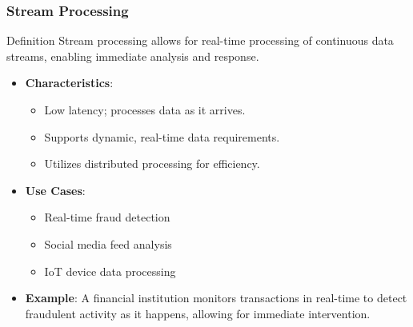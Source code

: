 \documentclass[aspectratio=169]{beamer}
\begin{document}
\begin{frame}[fragile]
    \frametitle{Stream Processing}
    \begin{block}{Definition}
        Stream processing allows for real-time processing of continuous data streams, enabling immediate analysis and response.
    \end{block}
    \begin{itemize}
        \item \textbf{Characteristics}:
        \begin{itemize}
            \item Low latency; processes data as it arrives.
            \item Supports dynamic, real-time data requirements.
            \item Utilizes distributed processing for efficiency.
        \end{itemize}
        
        \item \textbf{Use Cases}:
        \begin{itemize}
            \item Real-time fraud detection
            \item Social media feed analysis
            \item IoT device data processing
        \end{itemize}
        
        \item \textbf{Example}:
        A financial institution monitors transactions in real-time to detect fraudulent activity as it happens, allowing for immediate intervention.
    \end{itemize}
\end{frame}
\end{document}
